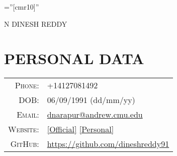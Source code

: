 \documentclass[a4paper,10pt]{article}
\begin{document}

\pagestyle{empty} %

\font\fb=''[cmr10]'' %

\par{\centering
		{\Huge N DINESH \textsc{REDDY}
	}\bigskip\par}

\section{PERSONAL DATA}

\begin{tabular}{rl}

    
    \textsc{Phone:}     & +14127081492 \\
    \textsc{DOB:}     & 06/09/1991 (dd/mm/yy)\\
    \textsc{Email:}     & \href{mailto:dnarapur@andrew.cmu.edu}{dnarapur@andrew.cmu.edu}\\
    

    \textsc{Website:}     & \href{https://ps.is.tuebingen.mpg.de/person/dreddy}{[Official]} \href{https://researchweb.iiit.ac.in/~dineshreddy.n/zerotype/}{[Personal]}\\
    \textsc{GitHub:}     & \href{https://github.com/dineshreddy91}{https://github.com/dineshreddy91}
\end{tabular}


\end{document}

